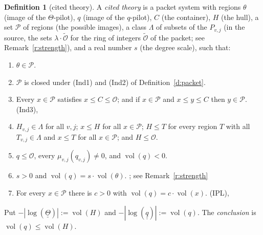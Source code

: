 \documentclass[11pt]{article}
\theoremstyle{plain}
\theoremstyle{definition}
\newtheorem{definition}[theorem]{Definition}
\theoremstyle{remark}
\newcommand{\vol}{\operatorname{vol}}
\newcommand{\Poss}{\mathcal P}
\newcommand{\cO}{\mathcal O}
\newcommand{\qbb}{\underline{\underline q}}
\newcommand{\Thbb}{\underline{\underline\Theta}}
\newcommand{\tO}{\widetilde{\mathcal O}}
\begin{document}
\begin{definition}[cited theory]\label{d:cited}
A \emph{cited theory} is a packet system with regions $\theta$ (image of the
$\Theta$-pilot), $q$ (image of the $q$-pilot), $C$ (the container), $H$ (the hull), a set
$\Poss$ of regions (the possible images), a class $\Lambda$ of subsets of the $P_{v,j}$
(in the source, the sets $\lambda\cdot\tO$ for the ring of integers $\tO$ of the packet; see
Remark~\ref{r:strength}), and a real number $s$ (the degree scale), such that:
\begin{enumerate}[label=(C\arabic*),leftmargin=2.8em]
\item\label{c:theta} $\theta\in\Poss$. \hfill\cite[Def.~3.8(i), Thm.~3.11(i)]{IUT3}
\item\label{c:ind12} $\Poss$ is closed under (Ind1) and (Ind2) of
  Definition~\ref{d:packet}. \hfill\cite[Thm.~3.11(i)]{IUT3}
\item\label{c:ind3} Every $x\in\Poss$ satisfies $x\le C\le\cO$; and if $x\in\Poss$ and
  $x\le y\le C$ then $y\in\Poss$. \hfill (Ind3), \cite[Thm.~3.11(ii), Prop.~3.5(ii)]{IUT3}
\item\label{c:hull} $H_{v,j}\in\Lambda$ for all $v,j$; $x\le H$ for all $x\in\Poss$;
  $H\le T$ for every region $T$ with all $T_{v,j}\in\Lambda$ and $x\le T$ for all
  $x\in\Poss$; and $H\le\cO$. \hfill\cite[Rem.~3.9.5(i)]{IUT3}
\item\label{c:q} $q\le\cO$, every $\mu_{v,j}(q_{v,j})\ne0$, and $\vol(q)<0$.
  \hfill\cite[Def.~3.1(b)]{IUT1}
\item\label{c:link} $s>0$ and $\vol(q)=s\cdot\vol(\theta)$.
  \hfill\cite[Def.~3.8(ii)]{IUT3}; see Remark~\ref{r:strength}
\item\label{c:ipl} For every $x\in\Poss$ there is $c>0$ with $\vol(q)=c\cdot\vol(x)$.
  \hfill (IPL), \cite[Rem.~3.11.1(iii)]{IUT3}
\end{enumerate}
Put $-|\log(\Thbb)|:=\vol(H)$ and $-|\log(\qbb)|:=\vol(q)$. The \emph{conclusion} is
$\vol(q)\le\vol(H)$.
\end{definition}
\end{document}
